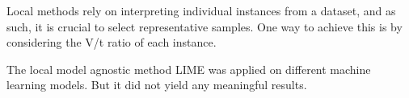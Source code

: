 Local methods rely on interpreting individual instances from a dataset, and as such, it is
crucial to select representative samples.
One way to achieve this is by considering the V/t ratio of each instance.

The local model agnostic method LIME was applied on different machine learning models.
But it did not yield any meaningful results.

%
%
%
%
%
%
%


